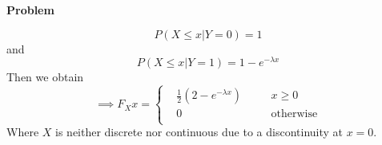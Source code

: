 \documentclass[12pt]{article}
\newenvironment{Ex}{\textbf{Problem}\vspace{.75em}\\}{}
\begin{document}
\begin{enumerate}
\begin{Ex}
\begin{solution}
\begin{equation}
        \label{eq:7-p-y-0}
        P(X\le x|Y=0) = 1
      \end{equation}
      and
      \begin{equation}
        \label{eq:7-p-y-1}
        P(X\le x|Y=1) = 1-e^{-\lambda x}
      \end{equation}
      Then we obtain
      \begin{equation}
        \label{eq:7-sol}
        \implies F_X{x} = \left\{
          \begin{aligned}
            & \frac{1}{2}(2-e^{-\lambda x}) &&\quad x\ge 0 \\
            & 0 &&\quad\text{otherwise} \\
          \end{aligned} \right.
      \end{equation}
      Where $X$ is neither discrete nor continuous due to a
      discontinuity at $x=0$.
    \end{solution}
  \end{Ex}
\end{enumerate}
\end{document}
